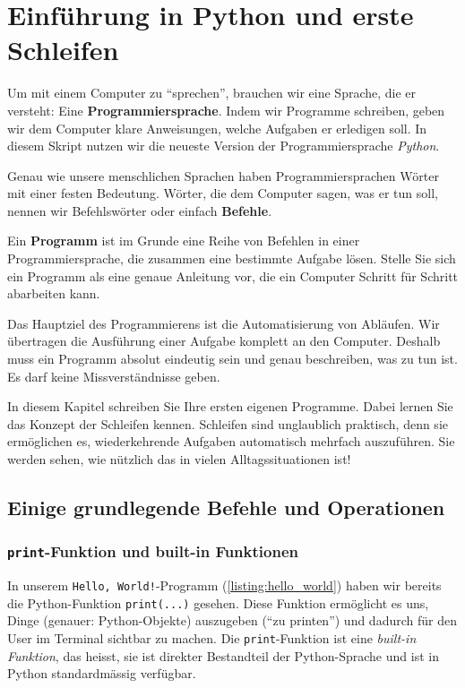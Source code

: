 \chapter{Einführung in Python und erste Schleifen}\label{ch:K02_Intro}


Um mit einem Computer zu \enquote{sprechen}, brauchen wir eine Sprache, die er versteht: Eine \textbf{Programmiersprache}. Indem wir Programme schreiben, geben wir dem Computer klare Anweisungen, welche Aufgaben er erledigen soll. In diesem Skript nutzen wir die neueste Version der Programmiersprache \emph{Python}.

Genau wie unsere menschlichen Sprachen haben Programmiersprachen Wörter mit einer festen Bedeutung. Wörter, die dem Computer sagen, was er tun soll, nennen wir Befehlswörter oder einfach \textbf{Befehle}.

Ein \textbf{Programm} ist im Grunde eine Reihe von Befehlen in einer Programmiersprache, die zusammen eine bestimmte Aufgabe lösen. Stelle Sie sich ein Programm als eine genaue Anleitung vor, die ein Computer Schritt für Schritt abarbeiten kann.

Das Hauptziel des Programmierens ist die Automatisierung von Abläufen. Wir übertragen die Ausführung einer Aufgabe komplett an den Computer. Deshalb muss ein Programm absolut eindeutig sein und genau beschreiben, was zu tun ist. Es darf keine Missverständnisse geben.

In diesem Kapitel schreiben Sie Ihre ersten eigenen Programme. Dabei lernen Sie das Konzept der Schleifen kennen. Schleifen sind unglaublich praktisch, denn sie ermöglichen es, wiederkehrende Aufgaben automatisch mehrfach auszuführen. Sie werden sehen, wie nützlich das in vielen Alltagssituationen ist!

\section{Einige grundlegende Befehle und Operationen}

\subsection{\texorpdfstring{\lstinline|print|}{print}-Funktion und built-in Funktionen}
In unserem \texttt{Hello, World!}-Programm (\cref{listing:hello_world}) haben wir bereits die Python-Funktion \lstinline|print(...)| gesehen.
Diese Funktion ermöglicht es uns, Dinge (genauer: Python-Objekte) auszugeben (\enquote{zu printen}) und dadurch für den User im Terminal sichtbar zu machen. Die \lstinline|print|-Funktion ist eine \emph{built-in Funktion}, das heisst, sie ist direkter Bestandteil der Python-Sprache und ist in Python standardmässig verfügbar.

